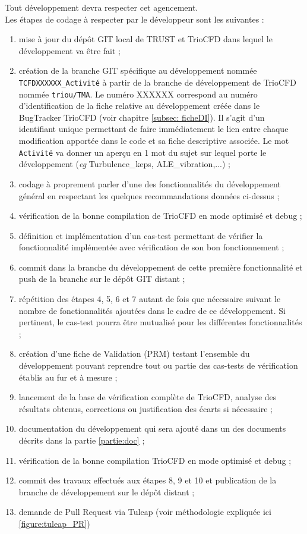 Tout développement devra respecter cet agencement.\\
Les étapes de codage \`a respecter par le développeur sont les suivantes :
\begin{enumerate}
   \item mise à jour du dépôt GIT local de TRUST et TrioCFD dans lequel le développement va être fait ;
   \item création de la branche GIT spécifique au développement
         nommée \texttt{TCFDXXXXXX\_Activité} à partir de la branche de développement
         de TrioCFD nommée \texttt{triou/TMA}.
         Le numéro XXXXXX correspond au numéro d'identification de la fiche relative au développement
         créée dans le BugTracker TrioCFD (voir chapitre \ref{subsec: ficheDI}).
         Il s'agit d'un identifiant unique permettant de faire immédiatement le lien entre chaque
         modification apportée dans le code et sa fiche descriptive associée.
         Le mot \texttt{Activité} va donner un aperçu en 1 mot du sujet sur lequel porte le développement (\textit{eg} Turbulence\_keps, ALE\_vibration,...) ;
   \item codage à proprement parler d'une des fonctionnalités du développement
         général en respectant les quelques recommandations données ci-dessus ;
   \item vérification de la bonne compilation de TrioCFD en mode optimisé et debug ;
   \item définition et implémentation d'un cas-test permettant de vérifier
         la fonctionnalité implémentée avec vérification de son bon fonctionnement ;
   \item commit dans la branche du développement de cette première fonctionnalité
         et push de la branche sur le dépôt GIT distant ;
   \item répétition des étapes 4, 5, 6  et 7 autant de fois que nécessaire suivant
         le nombre de fonctionnalités ajoutées dans le cadre de ce développement.
         Si pertinent, le cas-test pourra être mutualisé pour les différentes fonctionnalités ;
   \item création d'une fiche de Validation (PRM) testant l'ensemble
         du développement pouvant reprendre tout ou partie des cas-tests
         de vérification établis au fur et à mesure ;
   \item lancement de la base de vérification complète de TrioCFD,
         analyse des résultats obtenus, corrections ou justification des écarts si nécessaire ;
   \item documentation du développement qui sera ajouté
         dans un des documents décrits dans la partie \ref{partie:doc} ;
   \item vérification de la bonne compilation TrioCFD en mode optimisé et debug ;
   \item commit des travaux effectués aux étapes 8, 9 et 10 et publication de la branche de développement sur le dépôt distant ;
   \item demande de Pull Request via Tuleap (voir méthodologie expliquée ici \ref{figure:tuleap_PR})
\end{enumerate}

